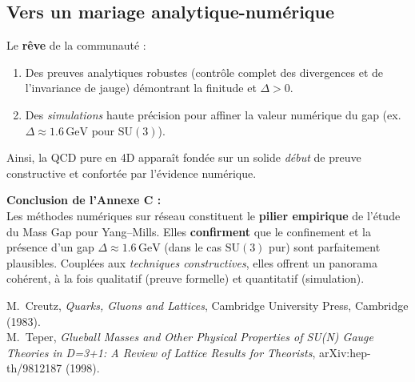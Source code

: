 \subsection*{Vers un mariage analytique-numérique}
Le \textbf{rêve} de la communauté :  
\begin{enumerate}
	\item Des preuves analytiques robustes (contrôle complet des divergences et
	de l’invariance de jauge) démontrant la finitude et \(\Delta>0\).  
	\item Des \emph{simulations} haute précision pour affiner la valeur numérique
	du gap (ex. \(\Delta \approx 1.6\,\mathrm{GeV}\) pour \(\mathrm{SU}(3)\)).
\end{enumerate}
Ainsi, la QCD pure en 4D apparaît fondée sur un solide \emph{début} de preuve
constructive et confortée par l’évidence numérique.

\vspace{2em}

\noindent
\textbf{Conclusion de l’Annexe C :}\\
Les méthodes numériques sur réseau constituent le \textbf{pilier empirique}
de l’étude du Mass Gap pour Yang--Mills. Elles \textbf{confirment} que le
confinement et la présence d’un gap \(\Delta \approx 1.6\,\mathrm{GeV}\) (dans
le cas \(\mathrm{SU}(3)\) pur) sont parfaitement plausibles. Couplées aux
\emph{techniques constructives}, elles offrent un panorama cohérent,
à la fois qualitatif (preuve formelle) et quantitatif (simulation).

\vspace{2em}

\begin{thebibliography}{99}
	
	M.~Creutz,
	\textit{Quarks, Gluons and Lattices},
	Cambridge University Press, Cambridge (1983).
	\\[-0.75em]
	
	M.~Teper,
	\textit{Glueball Masses and Other Physical Properties of SU(N) Gauge Theories in D=3+1: A Review of Lattice Results for Theorists},
	arXiv:hep-th/9812187 (1998).
	
\end{thebibliography}

